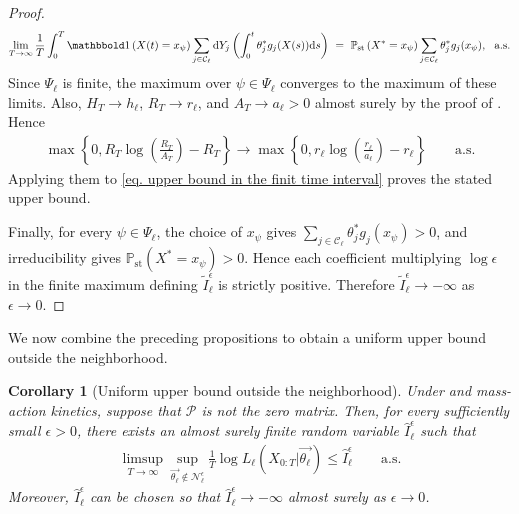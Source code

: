\documentclass[pdflatex,sn-mathphys-num]{sn-jnl}%
\def\dd{\text{d}}
\theoremstyle{thmstyleone}%
\newtheorem{corollary}[theorem]{Corollary}
\theoremstyle{thmstyletwo}%
\theoremstyle{thmstylethree}%
\begin{document}
\begin{appendices}
\begin{proof}
    \begin{align*}
        \lim_{T\to\infty}\frac{1}{T}\int_0^T
        \mathbbold 1\left(X(t)=x_\psi\right)
        \sum_{j\in\mathcal C_\ell}
        \dd Y_j\left(\int_0^t\theta_j^*g_j(X(s))\dd s\right)
        ~ = ~
        \mathbb P_\text{st}\left(X^*=x_\psi\right)
        \sum_{j\in\mathcal C_\ell}\theta_j^*g_j(x_\psi),
        ~~ \text{a.s.}
    \end{align*}
    Since $\Psi_\ell$ is finite, the maximum over $\psi\in\Psi_\ell$ converges to the maximum of these limits.
    Also, $H_T\to h_\ell$, $R_T\to r_\ell$, and $A_T\to a_\ell>0$ almost surely by the proof of .
    Hence
    \begin{align*}
        \max\left\{0,
        R_T\log\left(\frac{R_T}{A_T}\right)-R_T
        \right\}
        \to
        \max\left\{0,
        r_\ell\log\left(\frac{r_\ell}{a_\ell}\right)-r_\ell
        \right\}
        \qquad \text{a.s.}
    \end{align*}
    Applying them to \eqref{eq. upper bound in the finit time interval} proves the stated upper bound.

    Finally, for every $\psi\in\Psi_\ell$, the choice of $x_\psi$ gives $\sum_{j\in\mathcal C_\ell}\theta_j^*g_j(x_\psi)>0$, and irreducibility gives $\mathbb P_\text{st}(X^*=x_\psi)>0$.
    Hence each coefficient multiplying $\log\epsilon$ in the finite maximum defining $\tilde I_\ell^\epsilon$ is strictly positive.
    Therefore $\tilde I_\ell^\epsilon\to-\infty$ as $\epsilon\to0$.
\end{proof}


We now combine the preceding propositions to obtain a uniform upper bound outside the neighborhood. 

\begin{corollary}[Uniform upper bound outside the neighborhood]\label{corollary uniform upper bound outside neighborhood}
    Under  and mass-action kinetics, suppose that $\mathcal P$ is not the zero matrix.
    Then, for every sufficiently small $\epsilon>0$, there exists an almost surely finite random variable $\hat I^{\epsilon}_\ell$ such that
    \begin{align}\label{eq uniform upper bound outside neighborhood}
        \limsup_{T\to\infty}
        \sup_{\overrightarrow{\theta_\ell}\notin\mathcal N_\ell^\epsilon}
        \frac{1}{T}\log L_\ell\left(X_{0:T}\big|\overrightarrow{\theta_\ell}\right)
        \leq
        \hat I^{\epsilon}_\ell
        \qquad \text{a.s.}
    \end{align}
    Moreover, $\hat I^{\epsilon}_\ell$ can be chosen so that $\hat I^{\epsilon}_\ell\to -\infty$ almost surely as $\epsilon\to0$.
\end{corollary}


\end{appendices}
\end{document}
